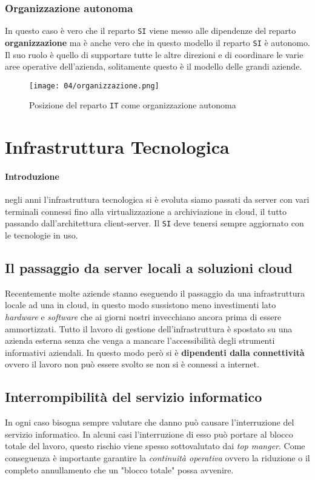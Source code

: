         \subsubsection{Organizzazione autonoma}
            In questo caso è vero che il reparto \texttt{SI} viene messo alle dipendenze del reparto \textbf{organizzazione} ma è anche vero che in questo modello il reparto \texttt{SI} è autonomo. Il suo ruolo è quello di supportare tutte le altre direzioni e di coordinare le varie aree operative dell'azienda, solitamente questo è il modello delle grandi aziende.
            \begin{figure}[H]
                \centering 
                \texttt{[image: 04/organizzazione.png]}
                \caption{Posizione del reparto \texttt{IT} come organizzazione autonoma}
            \end{figure}
\section{Infrastruttura Tecnologica}
    \paragraph{Introduzione} negli anni l'infrastruttura tecnologica si è evoluta siamo passati da server con vari terminali connessi fino alla virtualizzazione a archiviazione in cloud, il tutto passando dall'architettura client-server. Il \texttt{SI} deve tenersi sempre aggiornato con le tecnologie in uso.
    \subsection{Il passaggio da server locali a soluzioni cloud} Recentemente molte aziende stanno eseguendo il passaggio da una infrastruttura locale ad una in cloud, in questo modo sussistono meno investimenti lato \textit{hardware} e \textit{software} che ai giorni nostri invecchiano ancora prima di essere ammortizzati. Tutto il lavoro di gestione dell'infrastruttura è spostato su una azienda esterna senza che venga a mancare l'accessibilità degli strumenti informativi aziendali. In questo modo però si è \textbf{dipendenti dalla connettività} ovvero il lavoro non può essere svolto se non si è connessi a internet.
    \subsection{Interrompibilità del servizio informatico}
        In ogni caso bisogna sempre valutare che danno può causare l'interruzione del servizio informatico. In alcuni casi l'interruzione di esso può portare al blocco totale del lavoro, questo rischio viene spesso sottovalutato dai \textit{top manger}. Come conseguenza è importante garantire la \textit{continuità operativa} ovvero la riduzione o il completo annullamento che un "blocco totale" possa avvenire. 
